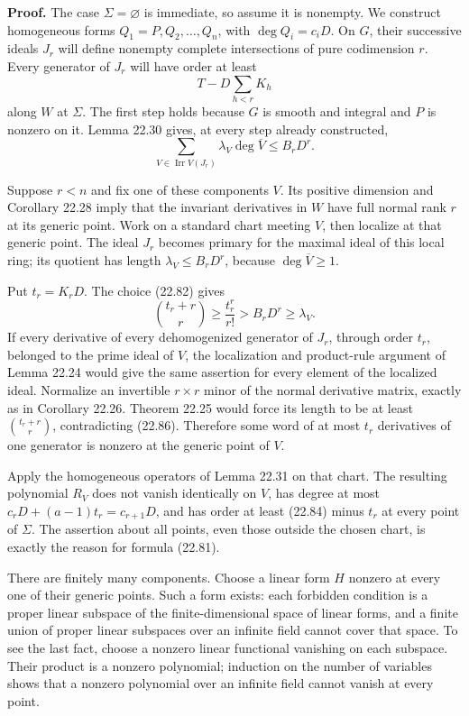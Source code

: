 \documentclass[
  11pt,
  a4paper,
]{article}
\newcounter{none} %
\begin{document}
\textbf{Proof.} The case \(\Sigma=\varnothing\) is immediate, so assume
it is nonempty. We construct homogeneous forms \(Q_1=P,Q_2,\ldots,Q_n\),
with \(\deg Q_i=c_iD\). On \(G\), their successive ideals \(J_r\) will
define nonempty complete intersections of pure codimension \(r\). Every
generator of \(J_r\) will have order at least \[
                   T-D\sum_{h<r}K_h
 \tag{22.84}
\] along \(W\) at \(\Sigma\). The first step holds because \(G\) is
smooth and integral and \(P\) is nonzero on it. Lemma 22.30 gives, at
every step already constructed, \[
        \sum_{V\in\operatorname{Irr}V(J_r)}
                 \lambda_V\deg\overline V\le B_rD^r.
 \tag{22.85}
\]

Suppose \(r<n\) and fix one of these components \(V\). Its positive
dimension and Corollary 22.28 imply that the invariant derivatives in
\(W\) have full normal rank \(r\) at its generic point. Work on a
standard chart meeting \(V\), then localize at that generic point. The
ideal \(J_r\) becomes primary for the maximal ideal of this local ring;
its quotient has length \(\lambda_V\le B_rD^r\), because
\(\deg\overline V\ge1\).

Put \(t_r=K_rD\). The choice (22.82) gives \[
 \binom{t_r+r}{r}\ge\frac{t_r^r}{r!}>B_rD^r\ge\lambda_V.
 \tag{22.86}
\] If every derivative of every dehomogenized generator of \(J_r\),
through order \(t_r\), belonged to the prime ideal of \(V\), the
localization and product-rule argument of Lemma 22.24 would give the
same assertion for every element of the localized ideal. Normalize an
invertible \(r\times r\) minor of the normal derivative matrix, exactly
as in Corollary 22.26. Theorem 22.25 would force its length to be at
least \(\binom{t_r+r}{r}\), contradicting (22.86). Therefore some word
of at most \(t_r\) derivatives of one generator is nonzero at the
generic point of \(V\).

Apply the homogeneous operators of Lemma 22.31 on that chart. The
resulting polynomial \(R_V\) does not vanish identically on \(V\), has
degree at most \(c_rD+(a-1)t_r=c_{r+1}D\), and has order at least
(22.84) minus \(t_r\) at every point of \(\Sigma\). The assertion about
all points, even those outside the chosen chart, is exactly the reason
for formula (22.81).

There are finitely many components. Choose a linear form \(H\) nonzero
at every one of their generic points. Such a form exists: each forbidden
condition is a proper linear subspace of the finite-dimensional space of
linear forms, and a finite union of proper linear subspaces over an
infinite field cannot cover that space. To see the last fact, choose a
nonzero linear functional vanishing on each subspace. Their product is a
nonzero polynomial; induction on the number of variables shows that a
nonzero polynomial over an infinite field cannot vanish at every point.
\end{document}
